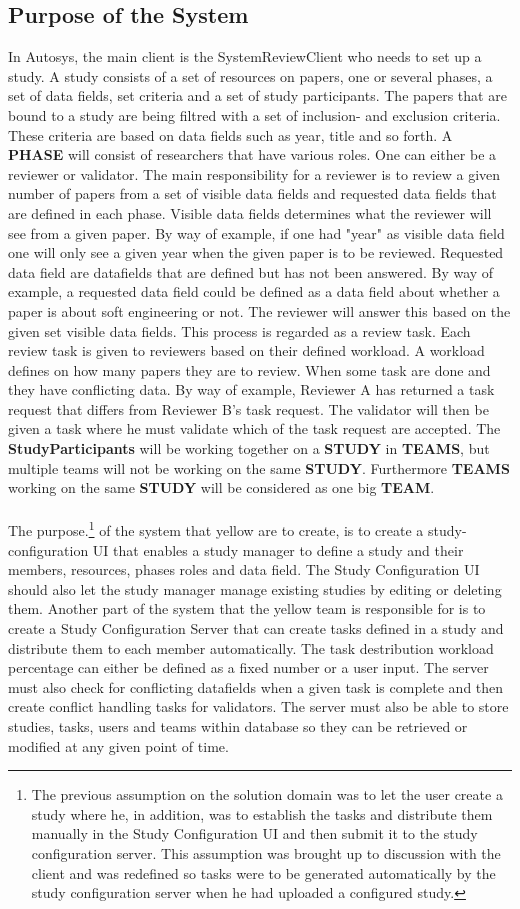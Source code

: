\subsection{Purpose of the System}
In Autosys, the main client is the SystemReviewClient who needs to set up a study. A study consists of a set of resources on papers,  one or several phases, a set of data fields, set criteria and a set of study participants. The papers that are bound to a study are being filtred with a set of inclusion- and exclusion criteria. These criteria are based on data fields such as year, title and so forth. A \textbf{PHASE} will consist of researchers that have various roles. One can either be a reviewer or validator. The main responsibility for a reviewer is to review a given number of papers from a set of visible data fields and requested data fields that are defined in each phase. Visible data fields determines what the reviewer will see from a given paper. By way of example, if one had "year" as visible data field one will only see a given year when the given paper is to be reviewed. Requested data field are datafields that are defined but has not been answered. By way of example, a requested data field could be defined as a data field about whether a paper is about soft engineering or not. The reviewer will answer this based on the given set visible data fields. This process is regarded as a review task. Each review task is given to reviewers based on their defined workload. A workload defines on how many papers they are to review. When some task are done and they have conflicting data. By way of example, Reviewer A has returned a task request that differs from Reviewer B's task request. The validator will then be given a task where he must validate which of the task request are accepted. The \textbf{StudyParticipants} will be working together on a \textbf{STUDY} in \textbf{TEAMS}, but multiple teams will not be working on the same \textbf{STUDY}. Furthermore \textbf{TEAMS} working on the same \textbf{STUDY} will be considered as one big \textbf{TEAM}.\\\\ The purpose.\footnote{The previous assumption on the solution domain was to let the user create a study  where he, in addition, was to establish the tasks and distribute them manually in the Study Configuration UI and then submit it to the study configuration server. This assumption was brought up to discussion with the client and was redefined so tasks were to be generated automatically by the study configuration server when he had uploaded a configured study.} of the system that yellow are to create, is to create a study-configuration UI that enables a study manager to define a study and their members, resources, phases roles and data field. The Study Configuration UI should also let the study manager manage existing studies by editing or deleting them. Another part of the system that the yellow team is responsible for is to create a Study Configuration Server that can create tasks defined in a study and distribute them to each member automatically. The task destribution workload percentage can either be defined as a fixed number or a user input. The server must also check for conflicting datafields when a given task is complete and then create conflict handling tasks for validators. The server must also be able to store studies, tasks, users and teams within database so they can be retrieved or modified at any given point of time.
